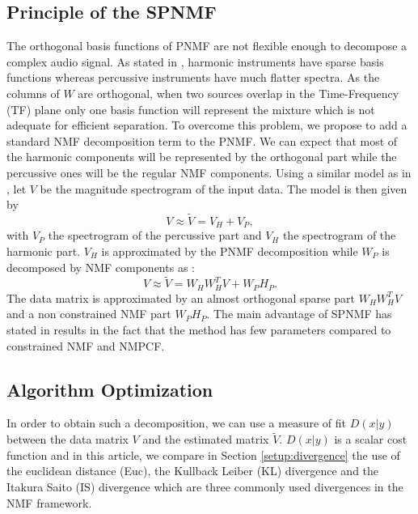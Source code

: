 \documentclass[journal]{IEEEtran}
\begin{document}
\subsection{Principle of the SPNMF}

The orthogonal basis functions of PNMF are not flexible enough to decompose a complex audio signal. As stated in \cite{canadas2014percussive}, harmonic instruments have sparse basis functions whereas percussive instruments have much flatter spectra. As the columns of $W$ are orthogonal, when two sources overlap in the Time-Frequency (TF) plane only one basis function will represent the mixture which is not adequate for efficient separation. To overcome this problem, we propose to add a standard NMF decomposition term to the PNMF. We can expect that most of the harmonic components will be represented by the orthogonal part while the percussive ones will be the regular NMF components. Using a similar model as in \cite{laroche2015structured}, let $V$ be the magnitude spectrogram of the input data. The model is then given by
\begin{equation} \label{Cfunction}
V \approx \tilde{V}= V_H + V_{P},
\end{equation}
with $V_P$ the spectrogram of the percussive part and $V_H$ the spectrogram of the harmonic part. $V_H$ is approximated by the PNMF decomposition while $W_P$ is decomposed by NMF components as :
\begin{equation}
V \approx \tilde{V}= W_{H}W_{H}^{T}V + W_{P} H_{P}.
\end{equation}
The data matrix is approximated by an almost orthogonal sparse part $W_HW_H^T V$ and a non constrained NMF part $W_PH_P$. The main advantage of SPNMF has stated in \cite{laroche2015structured} results in the fact that the method has few parameters compared to constrained NMF and NMPCF.

\subsection{Algorithm Optimization}

In order to obtain such a decomposition, we can use a measure of fit $D(x|y)$ between the data matrix $V$ and the estimated matrix $\tilde{V}$. $D(x|y)$ is a scalar cost function and in this article, we compare in Section \ref{setup:divergence} the use of the euclidean distance (Euc), the Kullback Leiber (KL) divergence and the Itakura Saito (IS) divergence which are three commonly used divergences in the NMF framework.
\end{document}
